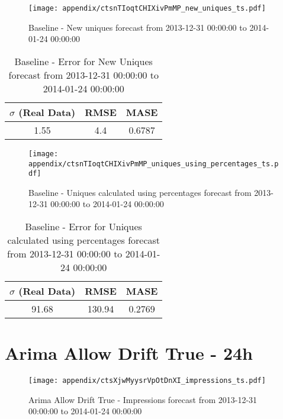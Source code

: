 \begin{figure}[H] \begin{center} \leavevmode
\texttt{[image: appendix/ctsnTIoqtCHIXivPmMP\_new\_uniques\_ts.pdf]} \caption[]{
Baseline - New uniques forecast from 2013-12-31 00:00:00 to 2014-01-24 00:00:00} \label{fig:appendix/ctsnTIoqtCHIXivPmMP_new_uniques_ts.pdf} \end{center}
\end{figure}

\begin{table}[H]
\centering
\footnotesize
\begin{tabular}{ccc}
$\sigma$ (Real Data) & RMSE & MASE   \\ \hline
1.55 & 4.4 & 0.6787 \\
\end{tabular}

\vspace{0.5cm}

\caption[]{
Baseline - Error for New Uniques forecast from 2013-12-31 00:00:00 to 2014-01-24 00:00:00}
\end{table}

\begin{figure}[H] \begin{center} \leavevmode
\texttt{[image: appendix/ctsnTIoqtCHIXivPmMP\_uniques\_using\_percentages\_ts.pdf]} \caption[]{
Baseline - Uniques calculated using percentages forecast from 2013-12-31 00:00:00 to 2014-01-24 00:00:00} \label{fig:appendix/ctsnTIoqtCHIXivPmMP_uniques_using_percentages_ts.pdf} \end{center}
\end{figure}

\begin{table}[H]
\centering
\footnotesize
\begin{tabular}{ccc}
$\sigma$ (Real Data) & RMSE & MASE   \\ \hline
91.68 & 130.94 & 0.2769 \\
\end{tabular}

\vspace{0.5cm}

\caption[]{
Baseline - Error for Uniques calculated using percentages forecast from 2013-12-31 00:00:00 to 2014-01-24 00:00:00}
\end{table}

\section{Arima Allow Drift True - 24h}
\begin{figure}[H] \begin{center} \leavevmode
\texttt{[image: appendix/ctsXjwMyysrVpOtDnXI\_impressions\_ts.pdf]} \caption[]{
Arima Allow Drift True - Impressions forecast from 2013-12-31 00:00:00 to 2014-01-24 00:00:00} \label{fig:appendix/ctsXjwMyysrVpOtDnXI_impressions_ts.pdf} \end{center}
\end{figure}

